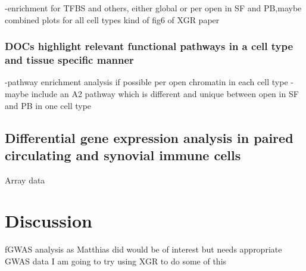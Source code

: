 -enrichment for TFBS and others, either global or per open in SF and PB,maybe combined plots for all cell types kind of fig6 of XGR paper







\subsubsection{DOCs highlight relevant functional pathways in a cell type and tissue specific manner}
-pathway enrichment analysis if possible per open chromatin in each cell type
-maybe include an A2 pathway which is different and unique between open in SF and PB in one cell type

\subsection{Differential gene expression analysis in paired circulating and synovial immune cells}
Array data

\section{Discussion}
%


fGWAS analysis as Matthias did would be of interest but needs appropriate GWAS data
I am going to try using XGR to do some of this 



